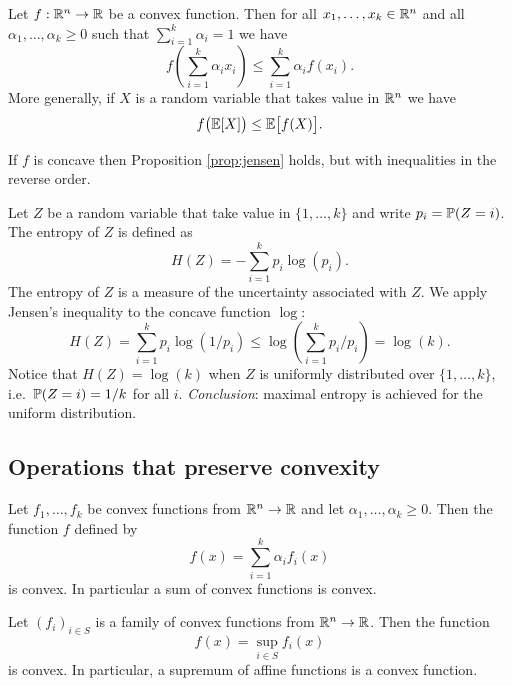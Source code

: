 \documentclass[11pt,nocut]{article}
\begin{document}
\begin{proposition}\label{prop:jensen}
	Let $f: \R^n \to \R$ be a convex function. Then for all $x_1, \dots, x_k \in \R^n$ and all $\alpha_1, \dots, \alpha_k \geq 0$ such that $\sum_{i=1}^k \alpha_i = 1$ we have
	$$
	f\left(\sum_{i=1}^k \alpha_i x_i \right) \leq \sum_{i=1}^k \alpha_i f(x_i).
	$$
	More generally, if $X$ is a random variable that takes value in $\R^n$ we have
	$$
	f\big(\E [X]\big) \leq \E \big[f(X)\big].
	$$
\end{proposition}
\begin{remark}
	If $f$ is concave then Proposition \ref{prop:jensen} holds, but with inequalities in the reverse order.
\end{remark}

\begin{example}
	Let $Z$ be a random variable that take value in $\{1, \dots, k\}$ and write $p_i = \P(Z = i)$. The entropy of $Z$ is defined as
	$$
	H(Z) = - \sum_{i=1}^k p_i \log(p_i).
	$$
	The entropy of $Z$ is a measure of the uncertainty associated with $Z$.
	We apply Jensen's inequality to the concave function $\log$:
	$$
	H(Z) = \sum_{i=1}^k p_i \log(1/p_i) \leq \log\left(\sum_{i=1}^k p_i / p_i\right) = \log(k).
	$$
	Notice that $H(Z) = \log(k)$ when $Z$ is uniformly distributed over $\{1,\dots,k\}$, i.e.\ $\P(Z=i) = 1/k$ for all $i$. \emph{Conclusion}: maximal entropy is achieved for the uniform distribution.
\end{example}


\subsection{Operations that preserve convexity}

\begin{proposition}
	Let $f_1, \dots, f_k$ be convex functions from $\R^n \to \R$ and let $\alpha_1, \dots, \alpha_k \geq 0$. Then the function $f$ defined by
	$$
	f(x) = \sum_{i=1}^k \alpha_i f_i(x)
	$$
	is convex. In particular a sum of convex functions is convex.
\end{proposition}

\begin{proposition}
	Let $(f_i)_{i \in S}$ is a family of convex functions from $\R^n \to \R$. Then the function
	$$
	f(x) = \sup_{i \in S} f_i(x)
	$$
	is convex. In particular, a supremum of affine functions is a convex function.
\end{proposition}
\end{document}
